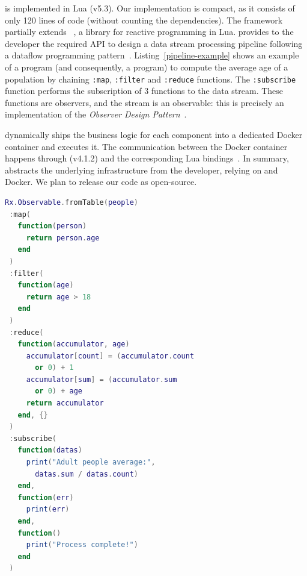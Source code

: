 \SYS is implemented in Lua (v5.3).
Our implementation is compact, as it consists of only 120 lines of code (without counting the dependencies).
The framework partially extends \rxl~\cite{github:rxlua}, a library for reactive programming in Lua.
\rxl provides to the developer the required API to design a data stream processing pipeline following a dataflow programming pattern~\cite{uustalu_essence_2005}.
Listing~\ref{pipeline-example} shows an example of a \rxl program (and consequently, a \SYS{} program) to compute the average age of a population by chaining \texttt{:map}, \texttt{:filter} and \texttt{:reduce} functions.
The \texttt{:subscribe} function performs the subscription of 3 functions to the data stream.
These functions are observers, and the stream is an observable: this is precisely an implementation of the \textit{Observer Design Pattern}~\cite{szallies_using_1997}.

\SYS{} dynamically ships the business logic for each component into a dedicated Docker container and executes it.
The communication between the Docker container happens through \zmq (v4.1.2) and the corresponding Lua bindings~\cite{github:lzmq}.
In summary, \SYS{} abstracts the underlying infrastructure from the developer, relying on \zmq and Docker.
We plan to release our code as open-source.

\begin{lstlisting}[language=LUA,caption={Example of process pipeline with RxLua.},label=pipeline-example]
Rx.Observable.fromTable(people)
 :map(
   function(person)
     return person.age
   end
 )
 :filter(
   function(age)
     return age > 18
   end
 )
 :reduce(
   function(accumulator, age)
     accumulator[count] = (accumulator.count
       or 0) + 1
     accumulator[sum] = (accumulator.sum
       or 0) + age
     return accumulator
   end, {}
 )
 :subscribe(
   function(datas)
     print("Adult people average:",
       datas.sum / datas.count)
   end,
   function(err)
     print(err)
   end,
   function()
     print("Process complete!")
   end
 )
\end{lstlisting}

